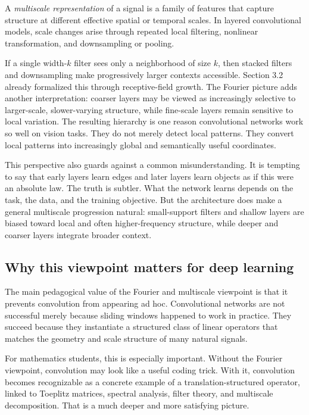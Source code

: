 \begin{definition}
A \emph{multiscale representation} of a signal is a family of features that capture structure at different effective spatial or temporal scales.
In layered convolutional models, scale changes arise through repeated local filtering, nonlinear transformation, and downsampling or pooling.
\end{definition}

\medskip

If a single width-$k$ filter sees only a neighborhood of size $k$, then stacked filters and downsampling make progressively larger contexts accessible.
Section 3.2 already formalized this through receptive-field growth.
The Fourier picture adds another interpretation:
coarser layers may be viewed as increasingly selective to larger-scale, slower-varying structure,
while fine-scale layers remain sensitive to local variation.
The resulting hierarchy is one reason convolutional networks work so well on vision tasks.
They do not merely detect local patterns.
They convert local patterns into increasingly global and semantically useful coordinates.

\medskip

This perspective also guards against a common misunderstanding.
It is tempting to say that early layers learn edges and later layers learn objects as if this were an absolute law.
The truth is subtler.
What the network learns depends on the task, the data, and the training objective.
But the architecture does make a general multiscale progression natural:
small-support filters and shallow layers are biased toward local and often higher-frequency structure,
while deeper and coarser layers integrate broader context.

\subsection*{Why this viewpoint matters for deep learning}

The main pedagogical value of the Fourier and multiscale viewpoint is that it prevents convolution from appearing ad hoc.
Convolutional networks are not successful merely because sliding windows happened to work in practice.
They succeed because they instantiate a structured class of linear operators that matches the geometry and scale structure of many natural signals.

\medskip

For mathematics students, this is especially important.
Without the Fourier viewpoint, convolution may look like a useful coding trick.
With it, convolution becomes recognizable as a concrete example of a translation-structured operator,
linked to Toeplitz matrices,
spectral analysis,
filter theory,
and multiscale decomposition.
That is a much deeper and more satisfying picture.

